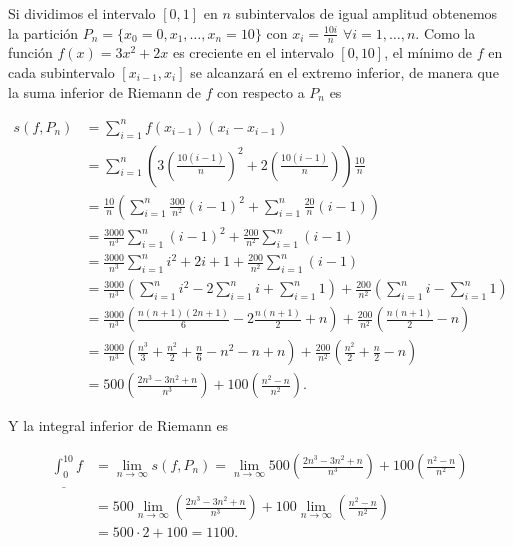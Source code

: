 \documentclass[
  spanish,
  a4paper,
]{scrreport}
\theoremstyle{definition}
\theoremstyle{remark}
\begin{document}
\begin{tcolorbox}[enhanced jigsaw, arc=.35mm, bottomrule=.15mm, bottomtitle=1mm, breakable, colback=white, colbacktitle=quarto-callout-tip-color!10!white, colframe=quarto-callout-tip-color-frame, coltitle=black, left=2mm, leftrule=.75mm, opacityback=0, opacitybacktitle=0.6, rightrule=.15mm, title=\textcolor{quarto-callout-tip-color}{\faLightbulb}\hspace{0.5em}{Solución}, titlerule=0mm, toprule=.15mm, toptitle=1mm]

Si dividimos el intervalo \([0,1]\) en \(n\) subintervalos de igual
amplitud obtenemos la partición \(P_n=\{x_0=0, x_1,\ldots, x_n=10\}\)
con \(x_i=\frac{10i}{n}\) \(\forall i=1,\ldots, n\). Como la función
\(f(x)=3x^2+2x\) es creciente en el intervalo \([0,10]\), el mínimo de
\(f\) en cada subintervalo \([x_{i-1},x_i]\) se alcanzará en el extremo
inferior, de manera que la suma inferior de Riemann de \(f\) con
respecto a \(P_n\) es

\begin{align*}
s(f,P_n) 
&= \sum_{i=1}^n f(x_{i-1})(x_i-x_{i-1}) \\
&= \sum_{i=1}^n \left(3\left(\frac{10(i-1)}{n}\right)^2 + 2\left(\frac{10(i-1)}{n}\right)\right)\frac{10}{n} \\
&= \frac{10}{n}\left(\sum_{i=1}^n \frac{300}{n^2}(i-1)^2 + \sum_{i=1}^n \frac{20}{n} (i-1)\right) \\
&= \frac{3000}{n^3} \sum_{i=1}^n (i-1)^2 + \frac{200}{n^2} \sum_{i=1}^n (i-1) \\
&= \frac{3000}{n^3} \sum_{i=1}^n i^2+2i+1 + \frac{200}{n^2} \sum_{i=1}^n (i-1) \\
&= \frac{3000}{n^3} \left(\sum_{i=1}^n i^2 - 2\sum_{i=1}^n i + \sum_{i=1}^n 1\right) + \frac{200}{n^2} \left(\sum_{i=1}^n i - \sum_{i=1}^n 1\right) \\
&= \frac{3000}{n^3} \left(\frac{n(n+1)(2n+1)}{6} -2 \frac{n(n+1)}{2} + n\right) + \frac{200}{n^2} \left(\frac{n(n+1)}{2} -n\right) \\
&= \frac{3000}{n^3} \left(\frac{n^3}{3}+\frac{n^2}{2}+\frac{n}{6}-n^2-n+n\right) + \frac{200}{n^2} \left(\frac{n^2}{2}+\frac{n}{2}-n\right) \\
&= 500 \left(\frac{2n^3-3n^2+n}{n^3}\right) + 100 \left(\frac{n^2-n}{n^2}\right).
\end{align*}

Y la integral inferior de Riemann es

\begin{align*}
\underline{\int_0^{10}} f 
&= \lim_{n\to\infty} s(f,P_n) 
= \lim_{n\to\infty} 500 \left(\frac{2n^3-3n^2+n}{n^3}\right) + 100 \left(\frac{n^2-n}{n^2}\right) \\
&= 500  \lim_{n\to\infty} \left(\frac{2n^3-3n^2+n}{n^3}\right) + 100 \lim_{n\to\infty} \left(\frac{n^2-n}{n^2}\right) \\
&= 500\cdot 2 + 100 = 1100.
\end{align*}

\end{tcolorbox}
\end{document}
